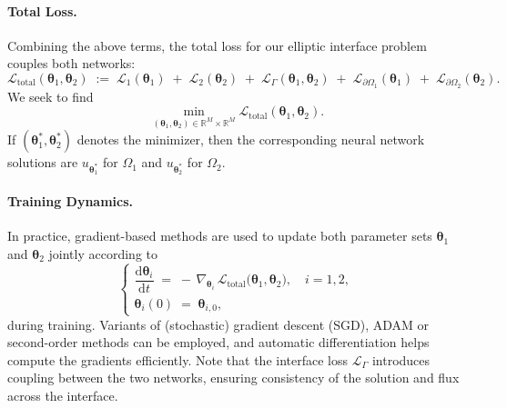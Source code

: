 \documentclass{article}
\begin{document}
\paragraph{Total Loss.}
Combining the above terms, the total loss for our elliptic interface problem couples both networks:
\begin{equation}\label{totelloss}
\mathcal{L}_{\text{total}}(\boldsymbol{\theta}_1, \boldsymbol{\theta}_2)
\;:=\;
\mathcal{L}_1(\boldsymbol{\theta}_1)
\;+\;
\mathcal{L}_2(\boldsymbol{\theta}_2)
\;+\;
\mathcal{L}_{\Gamma}(\boldsymbol{\theta}_1, \boldsymbol{\theta}_2)
\;+\;
\mathcal{L}_{\partial \Omega_1}(\boldsymbol{\theta}_1)
\;+\;
\mathcal{L}_{\partial \Omega_2}(\boldsymbol{\theta}_2).
\end{equation}
We seek to find
\[
\min_{(\boldsymbol{\theta}_1, \boldsymbol{\theta}_2) \in \mathbb{R}^M \times \mathbb{R}^M} 
\mathcal{L}_{\text{total}}(\boldsymbol{\theta}_1, \boldsymbol{\theta}_2).
\]
If $(\boldsymbol{\theta}_1^*, \boldsymbol{\theta}_2^*)$ denotes the minimizer, then the corresponding neural network solutions are $u_{\boldsymbol{\theta}_1^*}$ for $\Omega_1$ and $u_{\boldsymbol{\theta}_2^*}$ for $\Omega_2$.

\paragraph{Training Dynamics.}
In practice, gradient-based methods are used to update both parameter sets $\boldsymbol{\theta}_1$ and $\boldsymbol{\theta}_2$ jointly according to
\begin{equation}\label{trainingode}
\begin{cases}
\dfrac{\mathrm{d}\boldsymbol{\theta}_i}{\mathrm{d}t}
\;=\;
-\,\nabla_{\boldsymbol{\theta}_i}\,
\mathcal{L}_{\text{total}}\bigl(\boldsymbol{\theta}_1, \boldsymbol{\theta}_2\bigr), \quad i = 1, 2,
\\[6pt]
\boldsymbol{\theta}_i(0) \;=\;\boldsymbol{\theta}_{i,0},
\end{cases}
\end{equation}
during training. Variants of (stochastic) gradient descent (SGD), ADAM or second-order methods can be employed, and automatic differentiation helps compute the gradients efficiently. Note that the interface loss $\mathcal{L}_{\Gamma}$ introduces coupling between the two networks, ensuring consistency of the solution and flux across the interface.
\end{document}
